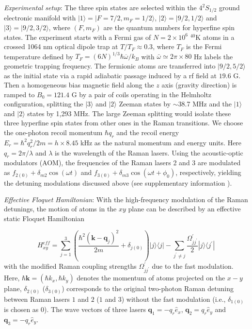 \documentclass[aps,prl,twocolumn,floatfix,reprint]{revtex4}
\begin{document}
\emph{Experimental setup}: The three spin states are selected within the $%
4^{2}S_{1/2}$ ground electronic manifold with $|1\rangle
=|F=7/2,m_{F}=1/2\rangle $, $|2\rangle =|9/2,1/2\rangle $ and $|3\rangle
=|9/2,3/2\rangle $, where $(F,m_{F})$ are the quantum numbers for hyperfine
spin states. The experiment starts with a Fermi gas of $N=2\times 10^{6}$ $%
^{40}$K atoms in a crossed 1064 nm optical dipole trap at $T/T_{F}\approx
0.3 $, where $T_{F}$ is the Fermi temperature defined by $%
T_{F}=(6N)^{1/3}\hbar \overline{\omega }/k_{B}$ with $\bar{\omega}\simeq
2\pi \times 80$ Hz labels the geometric trapping frequency. The fermionic
atoms are transferred into $|9/2,5/2\rangle $ as the initial state via a
rapid adiabatic passage induced by a rf field at $19.6$ G. Then a
homogeneous bias magnetic field along the $z$ axis (gravity direction) is
ramped to $B_{0}=121.4$ G by a pair of coils operating in the Helmholtz
configuration, splitting the $|3\rangle $ and $|2\rangle $ Zeeman states by $%
\sim $38.7 MHz and the $|1\rangle $ and $|2\rangle $ states by 1,293 MHz.
The large Zeeman splitting would isolate these three hyperfine spin states
from other ones in the Raman transitions. We choose the one-photon recoil
momentum $\hbar q_{r}$ and the recoil energy $E_{r}=\hbar
^{2}q_{r}^{2}/2m=h\times8.45$ kHz as the natural momentum and energy units.
Here $q_{r}=2\pi /\lambda $ and $\lambda $ is the wavelength of the Raman
lasers. Using the acoustic-optic modulators (AOM), the frequencies of the
Raman lasers 2 and 3 are modulated as $f_{2(0)}+\delta _{m2}\cos (\omega t)$
and $f_{3(0)}+\delta _{m3}\cos (\omega t+\phi _{0})$, respectively, yielding
the detuning modulations discussed above (see supplementary information \cite%
{supp}).

\emph{Effective Floquet Hamiltonian}: With the high-frequency modulation of
the Raman detunings, the motion of atoms in the $xy$ plane can be described
by an effective static Floquet Hamiltonian

\begin{equation}
H_{xy}^{eff}=\sum_{j=1}^{3}\left( \frac{\hbar ^{2}(\mathbf{k}-\mathbf{q}%
_{j})^{2}}{2m}+\delta _{j(0)}\right) |j\rangle \langle j|-\sum_{j^{\prime
}\neq j}\frac{\Omega _{jj^{\prime }}^{\prime }}{2}|j\rangle \langle
j^{\prime }|  \label{H_eff}
\end{equation}%
with the modified Raman coupling strengths $\Omega _{jj^{\prime }}^{\prime }$
due to the fast modulation. Here, $\hbar \mathbf{k}=(\hbar k_{x},\hbar
k_{y}) $ denotes the momentum of atoms projected on the $x-y$ plane, $\delta
_{2(0)} $ ($\delta _{3(0)}$) corresponds to the original two-photon Raman
detuning between Raman lasers $1$ and $2$ ($1$ and $3$) without the fast
modulation (i.e., $\delta _{1(0)}$ is chosen as 0). The wave vectors of
three lasers $\mathbf{q}_{1}=-q_{r}\hat{e}_{x}$, $\mathbf{q}_{2}=q_{r}\hat{e}%
_{y}$ and $\mathbf{q}_{3}=-q_{r}\hat{e}_{y}$.
\end{document}
